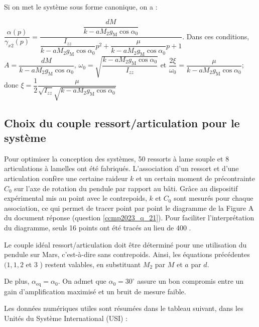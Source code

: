 \ifprof
\begin{corrige}
Si on met le système sous forme canonique, on a :

$\dfrac{\alpha(p)}{\gamma_{x 2}(p)} = \dfrac{\dfrac{d M}{k -a M_{2} g_{\mathrm{M}}  \cos \alpha_{0}}}{\dfrac{I_{z z}}{k -a M_{2} g_{\mathrm{M}}  \cos \alpha_{0}} p^2  +\dfrac{\mu}{k -a M_{2} g_{\mathrm{M}}  \cos \alpha_{0}}p +1}$.
Dans ces conditions, $A=\dfrac{d M}{k -a M_{2} g_{\mathrm{M}}  \cos \alpha_{0}}$, $\omega_0 = \sqrt{
\dfrac{k -a M_{2} g_{\mathrm{M}}  \cos \alpha_{0}}{I_{z z}}
}$ 
et $\dfrac{2\xi}{\omega_0} = \dfrac{\mu}{k -a M_{2} g_{\mathrm{M}}  \cos \alpha_{0}}$; donc 
$\xi =  \dfrac{1}{2}\dfrac{\mu}{\sqrt{I_{z z}}\sqrt{k -a M_{2} g_{\mathrm{M}}  \cos \alpha_{0}}} 
$

\end{corrige}
\else
\fi

\subsection{Choix du couple ressort/articulation pour le système}
Pour optimiser la conception des systèmes, 50 ressorts à lame souple et 8 articulations à lamelles ont été fabriqués. L'association d'un ressort et d'une articulation confère une certaine raideur $k$ et un certain moment de précontrainte $C_{0}$ sur l'axe de rotation du pendule par rapport au bâti. Grâce au dispositif expérimental mis au point avec le contrepoids, $k$ et $C_{0}$ sont mesurés pour chaque association, ce qui permet de tracer point par point le diagramme de la Figure A du document réponse (question \ref{ccmp2023_q_21}). Pour faciliter l'interprétation du diagramme, seuls 16 points ont été tracés au lieu de 400 .

Le couple idéal ressort/articulation doit être déterminé pour une utilisation du pendule sur Mars, c'est-à-dire sans contrepoids. Ainsi, les équations précédentes $(1,1,2$ et 3 ) restent valables, en substituant $M_{2}$ par $M$ et $a$ par $d$.

De plus, $\alpha_{\mathrm{eq}}=\alpha_{0}$. On admet que $\alpha_{0}=30^{\circ}$ assure un bon compromis entre un gain d'amplification maximisé et un bruit de mesure faible.

Les données numériques utiles sont résumées dans le tableau suivant, dans les Unités du Système International (USI) :

